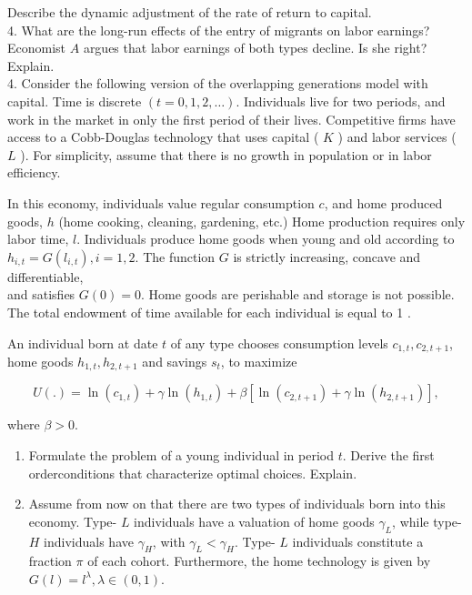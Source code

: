 \documentclass[10pt]{article}
\begin{document}
Describe the dynamic adjustment of the rate of return to capital.\\
4. What are the long-run effects of the entry of migrants on labor earnings? Economist $A$ argues that labor earnings of both types decline. Is she right? Explain.\\
4. Consider the following version of the overlapping generations model with capital. Time is discrete $(t=0,1,2, \ldots)$. Individuals live for two periods, and work in the market in only the first period of their lives. Competitive firms have access to a Cobb-Douglas technology that uses capital ( $K$ ) and labor services ( $L$ ). For simplicity, assume that there is no growth in population or in labor efficiency.

In this economy, individuals value regular consumption $c$, and home produced goods, $h$ (home cooking, cleaning, gardening, etc.) Home production requires only labor time, $l$. Individuals produce home goods when young and old according to $h_{i, t}=G\left(l_{i, t}\right), i=1,2$. The function $G$ is strictly increasing, concave and differentiable,\\
and satisfies $G(0)=0$. Home goods are perishable and storage is not possible. The total endowment of time available for each individual is equal to 1 .

An individual born at date $t$ of any type chooses consumption levels $c_{1, t}, c_{2, t+1}$, home goods $h_{1, t}, h_{2, t+1}$ and savings $s_{t}$, to maximize

$$
U(.)=\ln \left(c_{1, t}\right)+\gamma \ln \left(h_{1, t}\right)+\beta\left[\ln \left(c_{2, t+1}\right)+\gamma \ln \left(h_{2, t+1}\right)\right],
$$

where $\beta>0$.

\begin{enumerate}
  \item Formulate the problem of a young individual in period $t$. Derive the first orderconditions that characterize optimal choices. Explain.
  \item Assume from now on that there are two types of individuals born into this economy. Type- $L$ individuals have a valuation of home goods $\gamma_{L}$, while type- $H$ individuals have $\gamma_{H}$, with $\gamma_{L}<\gamma_{H}$. Type- $L$ individuals constitute a fraction $\pi$ of each cohort. Furthermore, the home technology is given by $G(l)=l^{\lambda}, \lambda \in(0,1)$.
\end{enumerate}
\end{document}
